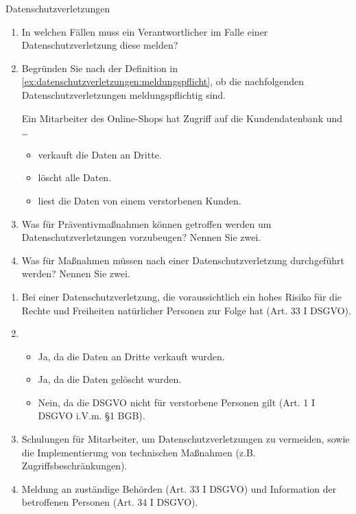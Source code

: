 \documentclass{article}
\begin{document}
\begin{exercise}{Datenschutzverletzungen}
  \begin{enumerate}
    \item\label{ex:datenschutzverletzungen:meldungspflicht} In welchen Fällen muss ein Verantwortlicher im Falle einer Datenschutzverletzung diese melden?
    \item Begründen Sie nach der Definition in \ref{ex:datenschutzverletzungen:meldungspflicht}, ob die nachfolgenden Datenschutzverletzungen meldungspflichtig sind.\par
          Ein Mitarbeiter des Online-Shops hat Zugriff auf die Kundendatenbank und \ldots
          \begin{itemize}
            \item verkauft die Daten an Dritte.
            \item löscht alle Daten.
            \item liest die Daten von einem verstorbenen Kunden.
          \end{itemize}
    \item Was für Präventivmaßnahmen können getroffen werden um Datenschutzverletzungen vorzubeugen? Nennen Sie zwei.
    \item Was für Maßnahmen müssen nach einer Datenschutzverletzung durchgeführt werden? Nennen Sie zwei.
  \end{enumerate}

  \begin{solution}
    \begin{enumerate}
      \item Bei einer Datenschutzverletzung, die voraussichtlich ein hohes Risiko für die Rechte und Freiheiten natürlicher Personen zur Folge hat (Art. 33 I DSGVO).
      \item
            \begin{itemize}
              \item Ja, da die Daten an Dritte verkauft wurden.
              \item Ja, da die Daten gelöscht wurden.
              \item Nein, da die DSGVO nicht für verstorbene Personen gilt (Art. 1 I DSGVO i.V.m. §1 BGB).
            \end{itemize}
      \item Schulungen für Mitarbeiter, um Datenschutzverletzungen zu vermeiden, sowie die Implementierung von technischen Maßnahmen (z.B. Zugriffsbeschränkungen).
      \item Meldung an zuständige Behörden (Art. 33 I DSGVO) und Information der betroffenen Personen (Art. 34 I DSGVO).
    \end{enumerate}
  \end{solution}
\end{exercise}
\end{document}
